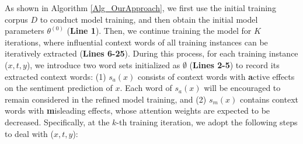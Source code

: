 \documentclass[11pt,a4paper]{article}
\begin{document}
As shown in Algorithm \ref{Alg_OurApproach},
we first use the initial training corpus $D$ to conduct model training,
and then obtain the initial model parameters $\theta^{(0)}$ (\textbf{Line 1}).
Then,
we continue training the model for $K$ iterations,
where influential context words of all training instances can be iteratively extracted (\textbf{Lines 6-25}).
During this process,
for each training instance ($x,t,y$),
we introduce two word sets initialized as $\emptyset$ (\textbf{Lines 2-5}) to record its extracted context words:
(1) $s_a(x)$ consists of context words with \textbf{a}ctive effects on the sentiment prediction of $x$.
Each word of $s_a(x)$ will be encouraged to remain considered in the refined model training,
and
(2) $s_m(x)$ contains context words with \textbf{m}isleading effects,
whose attention weights are expected to be decreased.
Specifically,
at the $k$-th training iteration,
we adopt the following steps to deal with ($x,t,y$):
\end{document}
